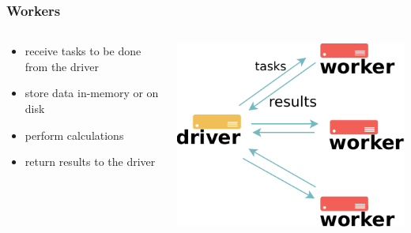 \documentclass[english,serif,mathserif]{beamer}
\begin{document}
\begin{frame}
  \frametitle{Workers}

  \begin{columns}
    \begin{column}{0.5\textwidth}
      \begin{itemize}
      \item
        receive tasks to be done from the driver
      \item
        store data in-memory or on disk
      \item
        perform calculations
      \item
        return results to the driver
  \end{itemize}
    \end{column}
    \begin{column}{0.5\textwidth}
      \includegraphics[height=0.45\textheight]{fig/spark_architecture.pdf}
    \end{column}
  \end{columns}
\end{frame}
\end{document}
